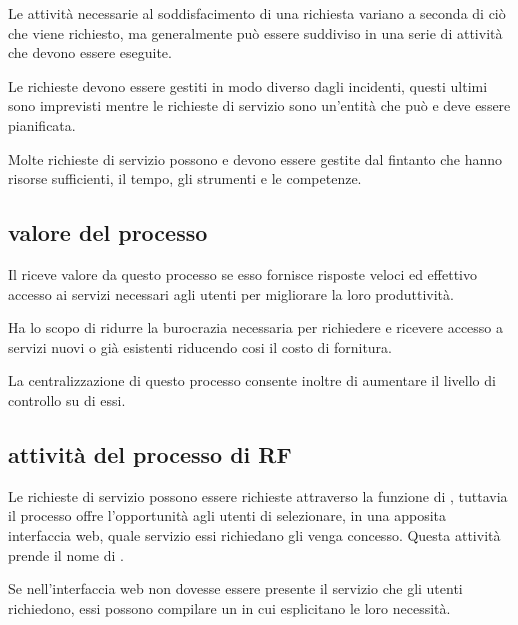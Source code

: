 Le attività necessarie al soddisfacimento di una richiesta variano a seconda di ciò che viene richiesto, ma generalmente può essere suddiviso in una serie di attività che devono essere eseguite.

Le richieste devono essere gestiti in modo diverso dagli incidenti, questi ultimi sono imprevisti mentre le richieste di servizio sono un'entità che può e deve essere pianificata.

Molte richieste di servizio possono e devono essere gestite dal  fintanto che hanno risorse sufficienti, il tempo, gli strumenti e le competenze.

\subsection[Valore del processo]{valore del processo}
\label{prc-request-value}
Il  riceve valore da questo processo se esso fornisce risposte veloci ed effettivo accesso ai servizi necessari agli utenti per migliorare la loro produttività.

Ha lo scopo di ridurre la burocrazia necessaria per richiedere e ricevere accesso a servizi nuovi o già esistenti riducendo cosi il costo di fornitura.

La centralizzazione di questo processo consente inoltre di aumentare il livello di controllo su di essi.

\subsection[Attività del processo di RF]{attività del processo di RF}
\label{prc-request-activities}
Le richieste di servizio possono essere richieste attraverso la funzione di , tuttavia il processo offre l'opportunità agli utenti di selezionare, in una apposita interfaccia web, quale servizio essi richiedano gli venga concesso. Questa attività prende il nome di .

Se nell'interfaccia web non dovesse essere presente il servizio che gli utenti richiedono, essi possono compilare un  in cui esplicitano le loro necessità.

